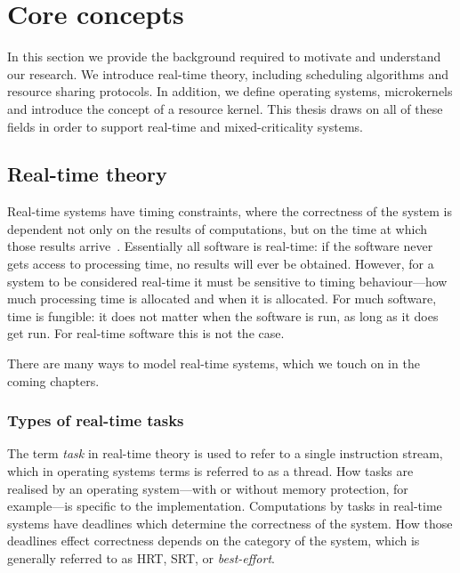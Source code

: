 




\chapter{Core concepts}
\label{chap:background}

In this section we provide the background required to motivate and understand our research.
We introduce real-time theory, including scheduling algorithms and resource sharing protocols.
In addition, we define operating systems, microkernels and introduce the concept of a resource kernel.
This thesis draws on all of these fields in order to support real-time and mixed-criticality systems.

\section{Real-time theory}
\label{sec:real-time-theory}

Real-time systems have timing constraints, where the correctness of the system is dependent not only
on the results of computations, but on the time at which those results
arrive~\citep{Stankovic_88}.  Essentially all software is real-time: if the software never gets
access to processing time, no results will ever be obtained.  However, for a system
to be considered real-time it must be sensitive to timing behaviour---how much processing time is
allocated and when it is allocated. For much software, time is
fungible: it does not matter when the software is run, as long as it does get run. For 
real-time software this is not the case.

There are many ways to model real-time systems, which we touch on in the coming chapters. 

\subsection{Types of real-time tasks}

The term \emph{task} in real-time theory is used to refer to a single instruction stream, which in 
operating systems terms is referred to as a thread. How tasks
are realised by an operating system---with or without memory protection, for example---is specific to the
implementation.  Computations by tasks in real-time systems have deadlines which determine the
correctness of the system. How those deadlines effect correctness depends on the category of the
system, which is generally referred to as \gls{HRT}, \gls{SRT}, or \emph{best-effort}.

